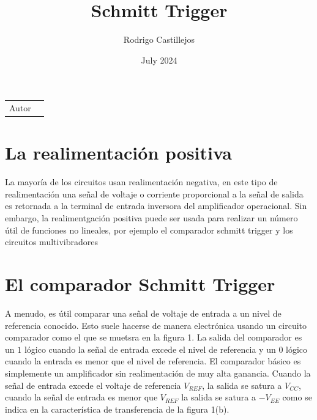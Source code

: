 \documentclass{article}
\title{Schmitt Trigger}
\author{Rodrigo Castillejos}
\date{July 2024}
\begin{document}
	
	\maketitle
	
	\noindent\begin{tabular}{@{}ll}
		Autor & \theauthor\\

	\end{tabular}
	
	\section*{La realimentación positiva}
	La mayoría de los circuitos usan realimentación negativa, en este tipo de realimentación una señal de voltaje o corriente proporcional a la señal de salida es retornada a la terminal de entrada inversora del amplificador operacional. Sin embargo, la realimentgación positiva puede ser usada para realizar un número útil de funciones no lineales, por ejemplo el comparador schmitt trigger y los circuitos multivibradores
	
	\section*{El comparador Schmitt Trigger}
	A menudo, es útil comparar una señal de voltaje de entrada a un nivel de referencia conocido. Esto suele hacerse de manera electrónica usando un circuito comparador como el que se muetsra en la figura 1. La salida del comparador es un $1$ lógico cuando la señal de entrada excede el nivel de referencia y un $0$ lógico cuando la entrada es menor que el nivel de referencia. El comparador básico es simplemente un amplificador sin realimentación de muy alta ganancia. Cuando la señal de entrada excede el voltaje de referencia $V_{REF}$, la salida se satura a $V_{CC}$, cuando la señal de entrada es menor que $V_{REF}$ la salida se satura a $-V_{EE}$ como se indica en la característica de transferencia de la figura 1(b).
\end{document}

